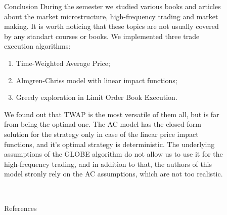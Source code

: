 \documentclass[]{beamer}
\begin{document}
\begin{frame}[t]
\begin{columns}[t]
\begin{column}{\twocolwid}
    \end{column} %
    
    \begin{column}{\sepwid}\end{column} %
    
    \begin{column}{\onecolwid} %
    
    
    \begin{block}{Conclusion}
        During the semester we studied various books and articles about the market microstructure, high-frequency trading and market making.
        It is worth noticing that these topics are not usually covered by any standart courses or books.
        We implemented three trade execution algorithms:

        \begin{enumerate}
            \item Time-Weighted Average Price;
            \item Almgren-Chriss model with linear impact functions;
            \item Greedy exploration in Limit Order Book Execution.
        \end{enumerate}
        We found out that TWAP is the most versatile of them all, but is far from being the optimal one. 
        The AC model has the closed-form solution for the strategy only in case of the 
        linear price impact functions, and it's optimal strategy is deterministic.
        The underlying assumptions of the GLOBE algorithm do not allow us to use it for the high-frequency trading, and in 
        addition to that, the authors of this model stronly rely on the AC assumptions, which are not too realistic. 
    \end{block}
    
    \



    
    \begin{block}{References}
    
    \printbibliography
    
    \end{block}
    
    \end{column} %
    
    \begin{column}{\lrmargin}\end{column} %
    
    \end{columns} %
    \end{frame} %
\end{document}

